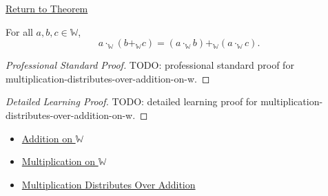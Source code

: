 \newpage
{}
\label{prf:multiplication-distributes-over-addition-on-w}

\begin{remark*}[Return]
\hyperref[thm:multiplication-distributes-over-addition-on-w]{Return to Theorem}
\end{remark*}

\begin{theorem*}
For all $a,b,c\in\mathbb{W}$,
\[
a\cdot_{\mathbb{W}}(b+_{\mathbb{W}}c)
=
(a\cdot_{\mathbb{W}}b)+_{\mathbb{W}}(a\cdot_{\mathbb{W}}c).
\]
\end{theorem*}

\begin{proof}[Professional Standard Proof]
\LRAProofBodyStart
TODO: professional standard proof for multiplication-distributes-over-addition-on-w.
\end{proof}

\begin{proof}[Detailed Learning Proof]
\LRAProofBodyStart
TODO: detailed learning proof for multiplication-distributes-over-addition-on-w.
\end{proof}

\begin{remark*}
\end{remark*}

\begin{dependencies}
\begin{itemize}
  \item \hyperref[def:addition-on-w]{Addition on $\mathbb{W}$}
  \item \hyperref[def:multiplication-on-w]{Multiplication on $\mathbb{W}$}
  \item \hyperref[thm:multiplication-distributes-over-addition]{Multiplication Distributes Over Addition}
\end{itemize}
\end{dependencies}

\clearpage
